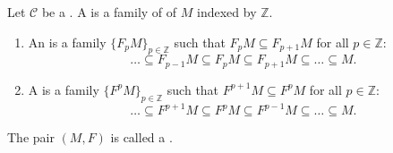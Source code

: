 \begin{definition} \label{definition:filtration_on_an_object_of_a_category}
    Let $\mathcal{C}$ be a . 
    A  is a family of  of $M$ indexed by $\mathbb{Z}$.

    \begin{enumerate}
        \item An  is a family $\{F_p M\}_{p \in \mathbb{Z}}$ such that $F_p M \subseteq F_{p+1} M$ for all $p \in \mathbb{Z}$:
        $$\dots \subseteq F_{p-1}M \subseteq F_pM \subseteq F_{p+1}M \subseteq \dots \subseteq M.$$
        
        \item A  is a family $\{F^p M\}_{p \in \mathbb{Z}}$ such that $F^{p+1} M \subseteq F^p M$ for all $p \in \mathbb{Z}$:
        $$\dots \subseteq F^{p+1}M \subseteq F^pM \subseteq F^{p-1}M \subseteq \dots \subseteq M.$$
    \end{enumerate}

    The pair $(M, F)$ is called a . 
\end{definition}



        

